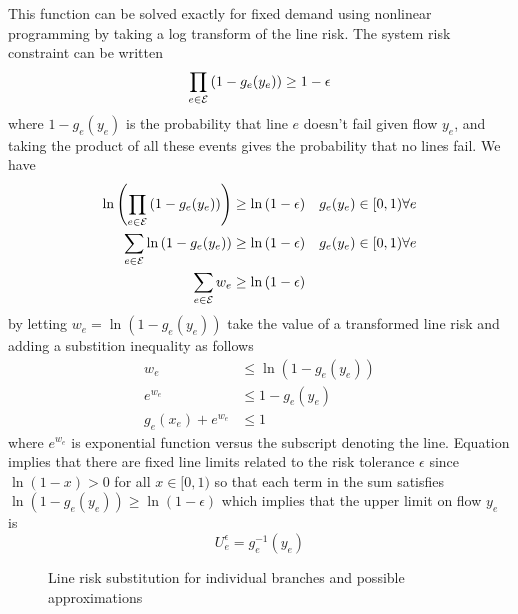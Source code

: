 This function can be solved exactly for fixed demand using nonlinear programming by taking a log transform of the line risk.  The system risk constraint can be written
\begin{equation*}  \prod_{e \in \mathcal{E}} \left( 1 - g_e(y_e) \right) \geq 1 - \epsilon
  \end{equation*}  
where $1 - g_e(y_e)$ is the probability that line $e$ doesn't fail given flow $y_e$, and taking the product of all these events gives the probability that no lines fail.  We have
\begin{align*}
  \ln \left( \prod_{e \in \mathcal{E}}\left( 1 - g_e(y_e)\right) \right) &\geq \ln \left(  1 - \epsilon \right)  & g_e(y_e) \in [0,1) \forall e  \\
  \sum_{e \in \mathcal{E}} \ln \left( 1-g_e(y_e) \right)  &\geq \ln \left( 1- \epsilon \right) & g_e(y_e) \in [0,1) \forall e  \\
\sum_{e \in \mathcal{E}} w_e & \geq \ln \left( 1-\epsilon \right)
\end{align*}
by letting $w_e = \ln \left( 1 -g_e(y_e) \right)$ take the value of a transformed line risk and adding a substition inequality as follows
\begin{align*}
w_e &\leq \ln \left( 1 - g_e(y_e)\right) \\
e^{w_e} &\leq 1-g_e(y_e) \\
g_e(x_e) + e^{w_e} &\leq 1 
\end{align*}
where $e^{w_e}$ is exponential function versus the subscript denoting the line.  Equation \label{cceqn} implies that there are fixed line limits related to the risk tolerance $\epsilon$ since $\ln \left(1 - x \right)>0 $ for all $x \in [0,1)$ so that each term in the sum satisfies  $\ln \left(1-g_e(y_e)\right) \geq \ln \left( 1-\epsilon \right)$ which implies that the upper limit on flow $y_e$ is
\begin{equation}
U_e^\epsilon = g_e^{-1}(y_e)
\end{equation}


\begin{figure}
\begin{center} 

\end{center}
\caption{Line risk substitution for individual branches and possible approximations}
\end{figure}




